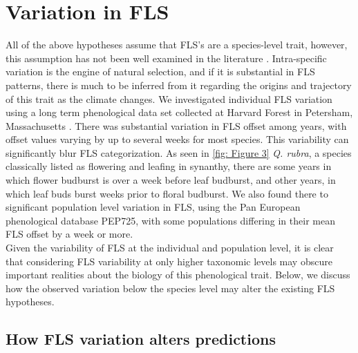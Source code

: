 \documentclass[12pt]{article}\usepackage[]{graphicx}\usepackage[]{color}
\begin{document}
\section*{Variation in FLS}
 \indent\indent All of the above hypotheses assume that FLS's are a species-level trait, however, this assumption has not been well examined in the literature \citep{Gougherty2018}. Intra-specific variation is the engine of natural selection, and if it is substantial in FLS patterns, there is much to be inferred from it regarding the origins and trajectory of this trait as the climate changes.
 We investigated individual FLS variation using a long term phenological data set collected at Harvard Forest in Petersham, Massachusetts \citep{OKeefe2015}. There was substantial variation in FLS offset among years, with offset values varying by up to several weeks for most species.  This variability  can significantly blur FLS categorization. As seen in \ref{fig: Figure 3} \textit{Q. rubra}, a species classically listed as flowering and leafing in synanthy, there are some years in which flower budburst is over a week before leaf budburst, and other years, in which leaf buds burst weeks prior to floral budburst. We also found there to significant population level variation in FLS, using the Pan European phenological database PEP725\citep{PEP725}, with some populations differing in their mean FLS offset by a week or more.\\
\indent Given the variability of FLS at the individual and population level, it is clear that considering FLS variability at only higher taxonomic levels may obscure important realities about the biology of this phenological trait. Below, we discuss how the observed variation below the species level may alter the existing FLS hypotheses.

\subsection*{How FLS variation alters predictions}
\end{document}
